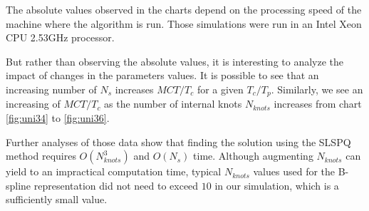 \documentclass[eprint]{actapoly}
\begin{document}
The absolute values observed in the charts depend on the processing speed of the machine
where the algorithm is run. Those simulations were run in an Intel Xeon CPU 2.53GHz processor.

But rather than observing the absolute values, it is interesting to analyze the impact of 
changes in the parameters values. It is possible to see that an increasing number of $N_s$ 
increases $MCT/T_c$ for a 
given $T_c/T_p$. Similarly, we see an increasing of $MCT/T_c$ as the number of
internal knots $N_{knots}$ increases from chart \ref{fig:uni34} to \ref{fig:uni36}.

Further analyses of those data show that finding the solution using the SLSPQ method 
requires $O(N_{knots}^3)$ and $O(N_s)$ time. Although augmenting $N_{knots}$ can yield
to an impractical computation time, typical $N_{knots}$ values used for the B-spline 
representation did not need to exceed $10$ in our simulation, which is a sufficiently
small value.
\end{document}
